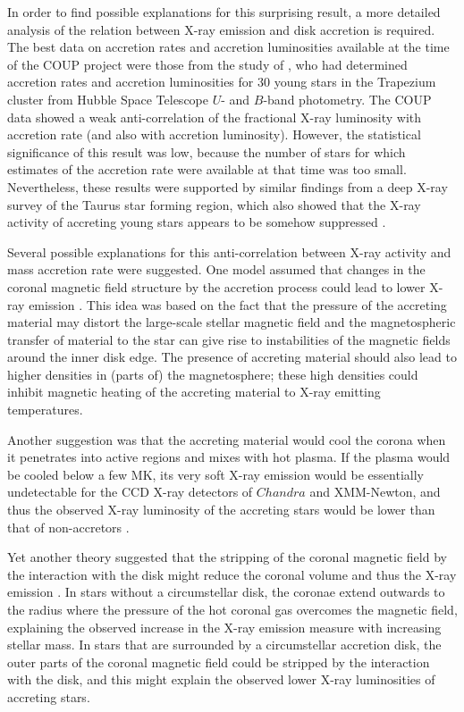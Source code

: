\documentclass[10pt,fleqn,twoside]{article}
\begin{document}
In order to find possible explanations for this surprising result, a more detailed
analysis of the relation between X-ray emission and disk accretion is required.
The best data on accretion rates and accretion luminosities
available at the time of the COUP project 
were those from the study of \citet{Robberto04},  who 
had determined
accretion rates and accretion luminosities for 30
young stars in the Trapezium cluster from Hubble Space Telescope $U$- and $B$-band photometry.
%
The COUP data showed  a weak anti-correlation of the fractional
X-ray luminosity with accretion rate (and also with accretion luminosity).
However,  the statistical significance of this result was low,
because the number of stars for which estimates of the 
accretion rate were available at that time was too small.
Nevertheless, these results were supported by similar findings from
a deep X-ray survey of the Taurus
star forming region, which  also showed   that
the X-ray activity of accreting young stars appears to be somehow suppressed \citep{Briggs07}.
\medskip



Several possible explanations for this  anti-correlation between X-ray activity 
and mass accretion rate were suggested.
One model assumed that changes in the coronal magnetic field
structure by the accretion process could lead to lower X-ray emission
\citep{Romanova04}. This idea was based on the fact that
the pressure of the accreting material may distort the large-scale
stellar magnetic field and
the magnetospheric transfer of material to the star can give rise to
instabilities of the magnetic fields around the inner disk edge.
The presence of accreting material should also lead to higher
densities in (parts of) the magnetosphere; these high densities
could inhibit magnetic heating of the
accreting material to X-ray emitting temperatures.

Another suggestion was that the  accreting material would cool the corona when it
penetrates into active regions and mixes with hot plasma.
If the plasma would be cooled below a few MK,
its very soft X-ray emission would be essentially undetectable for
the CCD X-ray detectors of $Chandra$ and XMM-Newton, and thus the
observed X-ray luminosity of the accreting stars would be lower
than that of non-accretors
\citep[see also][]{Telleschi07}.


Yet another theory suggested that the stripping of the coronal magnetic field 
by the interaction with the disk might reduce the coronal volume and thus the
X-ray emission \citep{Jardine06}.
In stars without a circumstellar disk,
the coronae extend outwards to the radius where the pressure of the
hot coronal gas overcomes the magnetic field,
explaining the observed increase in the X-ray emission measure
with increasing stellar mass.
In stars that are surrounded by a circumstellar accretion disk,
the outer parts of the coronal magnetic field could be stripped
by the interaction with the disk, and this might explain
the observed lower X-ray luminosities of accreting stars.
\end{document}
